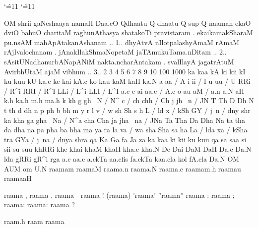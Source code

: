 \documentclass[12pt]{article}
\newcommand\isan{
	\catcode`\^=11
           \catcode`\~=11
           \fontspec[Script=Devanagari,Language=Sanskrit,Mapping=itrans-sdvn]{Siddhanta}
           }
\begin{document}
{\isan
\bigskip
OM shrii gaNeshaaya namaH 
\bigskip
Daa.cO Qdhaatu Q dhaatu Q sup Q naaman ekaO dviO bahuO
\bigskip
charitaM raghunAthasya shatakoTi pravistaram .
ekaikamakSharaM pu.nsAM mahApAtakanAshanam .. 1..
dhyAtvA nIlotpalashyAmaM rAmaM rAjIvalochanam .
jAnakIlakShmaNopetaM jaTAmukuTama.nDitam .. 2..
sAsitUNadhanurbANapANiM nakta.ncharAntakam .
svalIlayA jagatrAtuM AvirbhUtaM ajaM vibhum .. 3..
 2 3 4 5 6 7 8 9 10 100 1000
\bigskip
ka kaa kA ki kii kI ku kuu kU ka.c ke kai kA.c ko kau kaM kaH ka.N 
\bigskip
a     aa / A       i      ii / I       u     uu / U 
RRi / R^i    RRI / R^I    LLi / L^i    LLI / L^I
a.c     e      ai     aa.c / A.c   o     au     aM / a.n   a.N   aH
\bigskip
k.h ka.h m.h ma.h
k     kh     g     gh     ~N / N^
c / ch    chh / Ch     j     jh     ~n / JN
T     Th     D     Dh     N
t     th     d     dh     n
p     ph     b     bh     m
y     r      l     v / w
sh    Sh     s     h      L / ld
x / kSh     GY / j~n / dny     shr
\bigskip
ka     kha     ga     gha     ~Na / N^a
cha    Cha     ja     jha     ~na / JNa
Ta     Tha     Da     Dha     Na
ta     tha     da     dha     na
pa     pha     ba     bha     ma
ya     ra      la     va / wa
sha    Sha     sa     ha      La / lda
xa / kSha  tra   GYa / j~na / dnya     shra
qa Ka Ga fa Ja za 
\bigskip
ka kaa ki kii ku kuu qa 
sa saa si sii su suu
khRRi khe khai khaM khaH kha.c kha.N 
De Dai DaM DaH Da.c Da.N
lda gRRi gR^i rga 
a.c aa.c a.ckTa 
aa.cfis fa.ckTa kaa.cla kol fA.cla 
Da.N OM AUM om  U.N
raamam raamaM raama.n raama.N 
raama.c raamam.h raamau raamaaH

raama , raama . raama - raama ! (raama) 'raama'
''raama'' raama : raama ; raama: raama: raama ?

raam.h raam raama
}
\end{document}
